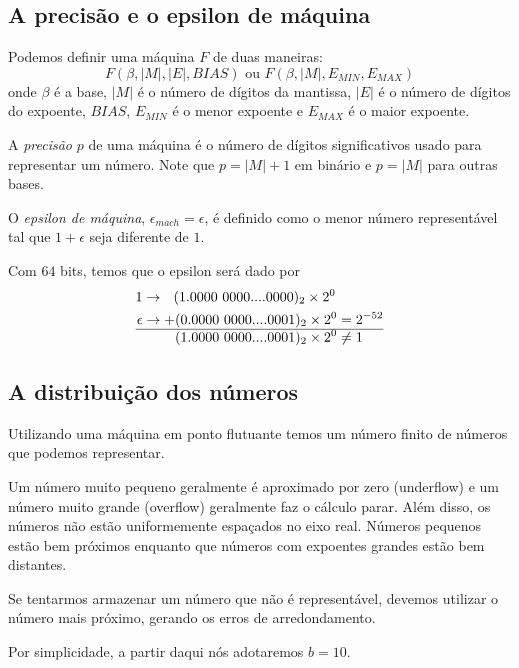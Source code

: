 \documentclass[main.tex]{subfiles}
\begin{document}
\subsection{A precisão e o epsilon de máquina}
Podemos definir uma máquina $F$ de duas maneiras:
$$ F(\beta,|M|,|E|,BIAS) \text{ ou } F(\beta,|M|,E_{MIN},E_{MAX})$$
onde $\beta$ é a base, $|M|$ é o número de dígitos da mantissa, $|E|$ é o número de dígitos do expoente, $BIAS$, $E_{MIN}$ é o menor expoente e $E_{MAX}$ é o maior expoente.

A \emph{precisão} $p$ de uma máquina é o número de dígitos significativos usado para representar um número. Note que $p=|M|+1$ em binário e $p=|M|$ para outras bases.

O \emph{epsilon de máquina}, $\epsilon_{mach}=\epsilon$, é definido como o menor número representável tal que $1+\epsilon$ seja diferente de $1$.

\begin{ex}
  Com $64$ bits, temos que o epsilon será dado por
\begin{align*}
  1      &\rightarrow ~~(1.0000~0000....0000)_2\times 2^{0} \\
\epsilon &\rightarrow  +(0.0000~0000....0001)_2\times 2^{0}  = 2^{-52} \\ \hline
         &      ~~~~~~~ (1.0000~0000....0001)_2\times 2^{0} \neq 1
\end{align*}



\end{ex}



\subsection{A distribuição dos números}
Utilizando uma máquina em ponto flutuante temos um número finito de números que podemos representar.

Um número muito pequeno geralmente é aproximado por zero (underflow) e um número muito grande (overflow) geralmente faz o cálculo parar.
Além disso, os números não estão uniformemente espaçados no eixo real. Números pequenos estão bem próximos enquanto que números com expoentes grandes estão bem distantes.

Se tentarmos armazenar um número que não é representável, devemos utilizar o número mais próximo, gerando os erros de arredondamento.

Por simplicidade, a partir daqui nós adotaremos $b=10$.
\end{document}
